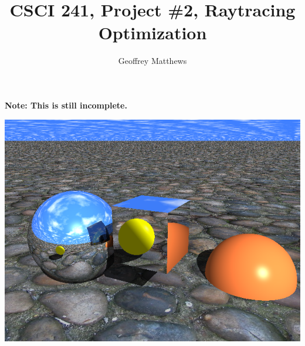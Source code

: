 \documentclass{article}
\title{CSCI 241, Project \#2, Raytracing Optimization}
\author{Geoffrey Matthews}
\begin{document}
\maketitle

\centerline{\bf Note:  This is still incomplete.}

\centerline{\includegraphics[scale=0.5]{testmain.png}}
\end{document}
